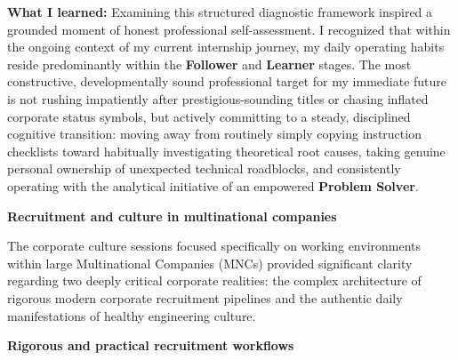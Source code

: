 \textbf{What I learned:} Examining this structured diagnostic framework
inspired a grounded moment of honest professional self-assessment. I
recognized that within the ongoing context of my current internship
journey, my daily operating habits reside predominantly within the
\textbf{Follower} and \textbf{Learner} stages. The most constructive,
developmentally sound professional target for my immediate future is not
rushing impatiently after prestigious-sounding titles or chasing
inflated corporate status symbols, but actively committing to a steady,
disciplined cognitive transition: moving away from routinely simply
copying instruction checklists toward habitually investigating
theoretical root causes, taking genuine personal ownership of unexpected
technical roadblocks, and consistently operating with the analytical
initiative of an empowered \textbf{Problem Solver}.

\vspace{0.5em}\noindent\textbf{Recruitment and culture in multinational
companies}\par

The corporate culture sessions focused specifically on working
environments within large Multinational Companies (MNCs) provided
significant clarity regarding two deeply critical corporate realities:
the complex architecture of rigorous modern corporate recruitment
pipelines and the authentic daily manifestations of healthy engineering
culture.

\vspace{0.5em}\noindent\textbf{Rigorous and practical recruitment
workflows}\par

